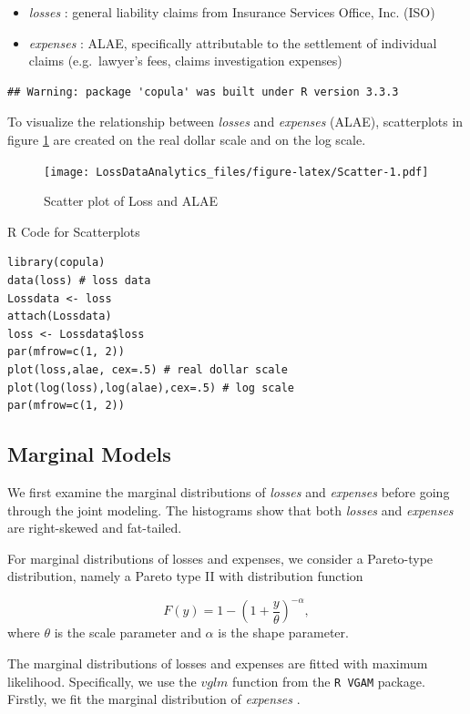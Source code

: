 \documentclass[]{book}
\providecommand{\tightlist}{%
  \setlength{\itemsep}{0pt}\setlength{\parskip}{0pt}}
\theoremstyle{definition}
\theoremstyle{definition}
\theoremstyle{definition}
\theoremstyle{remark}
\begin{document}
\begin{itemize}
\tightlist
\item
  \emph{losses }: general liability claims from Insurance Services
  Office, Inc. (ISO)
\item
  \emph{expenses }: ALAE, specifically attributable to the settlement of
  individual claims (e.g.~lawyer's fees, claims investigation expenses)
\end{itemize}

\begin{verbatim}
## Warning: package 'copula' was built under R version 3.3.3
\end{verbatim}

To visualize the relationship between \emph{losses } and \emph{expenses
} (ALAE), scatterplots in figure \ref{fig:Scatter} are created on the
real dollar scale and on the log scale.

\begin{figure}
\centering
\texttt{[image: LossDataAnalytics\_files/figure-latex/Scatter-1.pdf]}
\caption{\label{fig:Scatter}Scatter plot of Loss and ALAE}
\end{figure}

R Code for Scatterplots

\hypertarget{display.ScaHis.2}{}
\begin{verbatim}
library(copula)
data(loss) # loss data
Lossdata <- loss 
attach(Lossdata) 
loss <- Lossdata$loss
par(mfrow=c(1, 2))
plot(loss,alae, cex=.5) # real dollar scale
plot(log(loss),log(alae),cex=.5) # log scale
par(mfrow=c(1, 2))
\end{verbatim}

\subsection{Marginal Models}\label{marginal-models}

We first examine the marginal distributions of \emph{losses } and
\emph{expenses } before going through the joint modeling. The histograms
show that both \emph{losses } and \emph{expenses } are right-skewed and
fat-tailed.

For marginal distributions of losses and expenses, we consider a
Pareto-type distribution, namely a Pareto type II with distribution
function

\[ F(y)=1- \left( 1 + \frac{y}{\theta} \right) ^{-\alpha},\] where
\(\theta\) is the scale parameter and \(\alpha\) is the shape parameter.

The marginal distributions of losses and expenses are fitted with
maximum likelihood. Specifically, we use the \(vglm\) function from the
\texttt{R\ VGAM} package. Firstly, we fit the marginal distribution of
\emph{expenses }.
\end{document}
